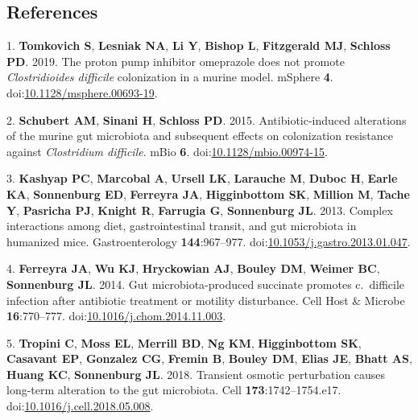 \documentclass[
  11pt,
]{article}
\begin{document}
\hypertarget{references}{%
\subsection*{References}\label{references}}

\hypertarget{refs}{}
\leavevmode\hypertarget{ref-Tomkovich2019}{}%
1. \textbf{Tomkovich S}, \textbf{Lesniak NA}, \textbf{Li Y},
\textbf{Bishop L}, \textbf{Fitzgerald MJ}, \textbf{Schloss PD}. 2019.
The proton pump inhibitor omeprazole does not promote
\emph{Clostridioides difficile} colonization in a murine model. mSphere
\textbf{4}.
doi:\href{https://doi.org/10.1128/msphere.00693-19}{10.1128/msphere.00693-19}.

\leavevmode\hypertarget{ref-Schubert2015}{}%
2. \textbf{Schubert AM}, \textbf{Sinani H}, \textbf{Schloss PD}. 2015.
Antibiotic-induced alterations of the murine gut microbiota and
subsequent effects on colonization resistance against \emph{Clostridium
difficile}. mBio \textbf{6}.
doi:\href{https://doi.org/10.1128/mbio.00974-15}{10.1128/mbio.00974-15}.

\leavevmode\hypertarget{ref-Kashyap2013}{}%
3. \textbf{Kashyap PC}, \textbf{Marcobal A}, \textbf{Ursell LK},
\textbf{Larauche M}, \textbf{Duboc H}, \textbf{Earle KA},
\textbf{Sonnenburg ED}, \textbf{Ferreyra JA}, \textbf{Higginbottom SK},
\textbf{Million M}, \textbf{Tache Y}, \textbf{Pasricha PJ},
\textbf{Knight R}, \textbf{Farrugia G}, \textbf{Sonnenburg JL}. 2013.
Complex interactions among diet, gastrointestinal transit, and gut
microbiota in humanized mice. Gastroenterology \textbf{144}:967--977.
doi:\href{https://doi.org/10.1053/j.gastro.2013.01.047}{10.1053/j.gastro.2013.01.047}.

\leavevmode\hypertarget{ref-Ferreyra2014}{}%
4. \textbf{Ferreyra JA}, \textbf{Wu KJ}, \textbf{Hryckowian AJ},
\textbf{Bouley DM}, \textbf{Weimer BC}, \textbf{Sonnenburg JL}. 2014.
Gut microbiota-produced succinate promotes c.~difficile infection after
antibiotic treatment or motility disturbance. Cell Host \& Microbe
\textbf{16}:770--777.
doi:\href{https://doi.org/10.1016/j.chom.2014.11.003}{10.1016/j.chom.2014.11.003}.

\leavevmode\hypertarget{ref-Tropini2018}{}%
5. \textbf{Tropini C}, \textbf{Moss EL}, \textbf{Merrill BD}, \textbf{Ng
KM}, \textbf{Higginbottom SK}, \textbf{Casavant EP}, \textbf{Gonzalez
CG}, \textbf{Fremin B}, \textbf{Bouley DM}, \textbf{Elias JE},
\textbf{Bhatt AS}, \textbf{Huang KC}, \textbf{Sonnenburg JL}. 2018.
Transient osmotic perturbation causes long-term alteration to the gut
microbiota. Cell \textbf{173}:1742--1754.e17.
doi:\href{https://doi.org/10.1016/j.cell.2018.05.008}{10.1016/j.cell.2018.05.008}.
\end{document}
